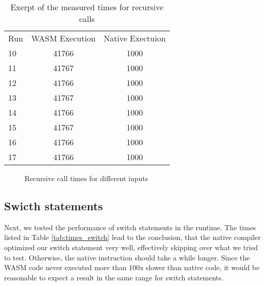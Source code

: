\begin{table}[h]
    \begin{tabular}{l c c}
        Run & WASM Execution & Native Exectuion \\
        10  & 41766          & 1000             \\
        11  & 41767          & 1000             \\
        12  & 41766          & 1000             \\
        13  & 41767          & 1000             \\
        14  & 41766          & 1000             \\
        15  & 41767          & 1000             \\
        16  & 41766          & 1000             \\
        17  & 41766          & 1000             \\
    \end{tabular}
    \caption{Exerpt of the measured times for recursive calls}
    \label{tab:times_recursive}
\end{table}

\begin{figure}[h]
    \caption{Recursive call times for different inputs}
    \label{fig:times_recursive}
\end{figure}

\subsection{Swicth statements}

Next, we tested the performance of switch statements in the runtime. The times listed in Table \ref{tab:times_switch} lead to the conclusion, that the native compiler optimized our switch statement very well, effectively skipping over what we tried to test. Otherwise, the native instruction should take a while longer. Since the WASM code never executed more than 100x slower than native code, it would be reasonable to expect a result in the same range for switch statements.

